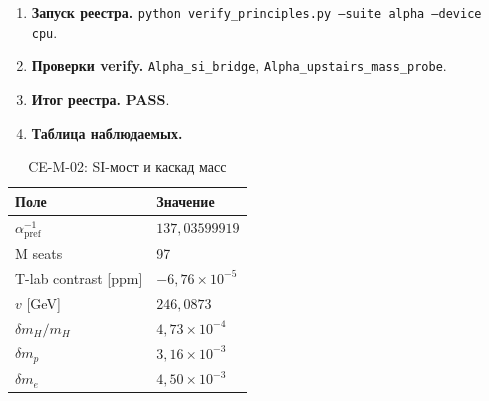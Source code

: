 \label{exp:cem02}
\begin{enumerate}[label=\textbf{Шаг \arabic*:},leftmargin=*,itemsep=0.35em]
\item \textbf{Запуск реестра.} \texttt{python verify\_principles.py --suite alpha --device cpu}.
\item \textbf{Проверки verify.} \texttt{Alpha\_si\_bridge}, \texttt{Alpha\_upstairs\_mass\_probe}.
\item \textbf{Итог реестра.} \textbf{PASS}.
\item \textbf{Таблица наблюдаемых.}
\end{enumerate}
\medskip
\begin{table}[htbp]
\centering
\small
\caption{CE-M-02: SI-мост и каскад масс}
\label{tab:exp-ce-m-02}
\begin{tabular}{@{}ll@{}}
\toprule
Поле & Значение \\
\midrule
$\alpha^{-1}_{\mathrm{pref}}$ & $137{,}03599919$ \\
M seats & 97 \\
T-lab contrast [ppm] & $-6{,}76\times 10^{-5}$ \\
$v$ [GeV] & $246{,}0873$ \\
$\delta m_H/m_H$ & $4{,}73\times 10^{-4}$ \\
$\delta m_p$ & $3{,}16\times 10^{-3}$ \\
$\delta m_e$ & $4{,}50\times 10^{-3}$ \\
\bottomrule
\end{tabular}
\end{table}
